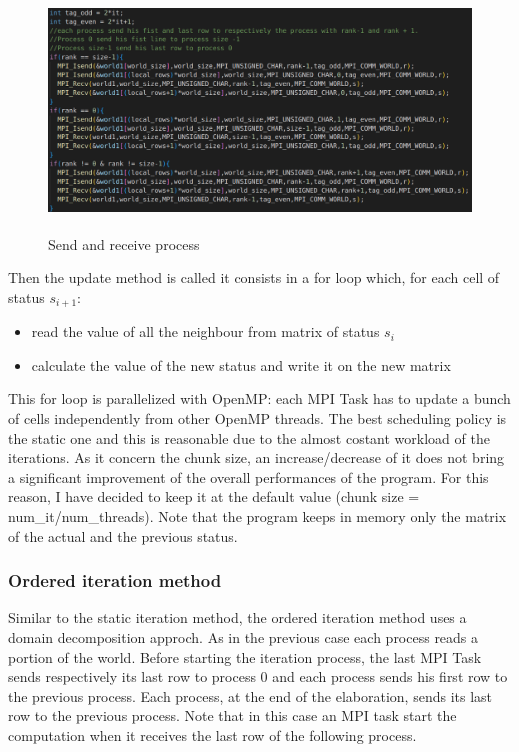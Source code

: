 \documentclass[
  letterpaper,
  DIV=11,
  numbers=noendperiod]{scrartcl}
\providecommand{\tightlist}{%
  \setlength{\itemsep}{0pt}\setlength{\parskip}{0pt}}\usepackage{longtable,booktabs,array}
\begin{document}
\begin{figure}

{\centering \includegraphics[width=\textwidth,height=2.5in]{img/send_receive_ordered.png}

}

\caption{Send and receive process}

\end{figure}

Then the update method is called it consists in a for loop which, for
each cell of status \(s_{i+1}\):

\begin{itemize}
\tightlist
\item
  read the value of all the neighbour from matrix of status \(s_{i}\)
\item
  calculate the value of the new status and write it on the new matrix
\end{itemize}

This for loop is parallelized with OpenMP: each MPI Task has to update a
bunch of cells independently from other OpenMP threads. The best
scheduling policy is the static one and this is reasonable due to the
almost costant workload of the iterations. As it concern the chunk size,
an increase/decrease of it does not bring a significant improvement of
the overall performances of the program. For this reason, I have decided
to keep it at the default value (chunk size = num\_it/num\_threads).
Note that the program keeps in memory only the matrix of the actual and
the previous status.

\hypertarget{ordered-iteration-method}{%
\subsubsection{Ordered iteration
method}\label{ordered-iteration-method}}

Similar to the static iteration method, the ordered iteration method
uses a domain decomposition approch. As in the previous case each
process reads a portion of the world. Before starting the iteration
process, the last MPI Task sends respectively its last row to process 0
and each process sends his first row to the previous process. Each
process, at the end of the elaboration, sends its last row to the
previous process. Note that in this case an MPI task start the
computation when it receives the last row of the following process.
\end{document}
